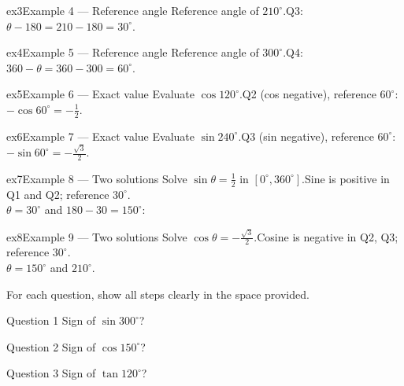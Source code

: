 \documentclass[11pt]{article}
\begin{document}
\begin{example}{ex3}{Example 4 --- Reference angle}
Reference angle of $210^\circ$.\soln Q3: $\theta-180=210-180=30^\circ$.
\end{example}

\begin{example}{ex4}{Example 5 --- Reference angle}
Reference angle of $300^\circ$.\soln Q4: $360-\theta=360-300=60^\circ$.
\end{example}

\begin{example}{ex5}{Example 6 --- Exact value}
Evaluate $\cos120^\circ$.\soln Q2 (cos negative), reference $60^\circ$: $-\cos60^\circ=-\tfrac12$.
\end{example}

\begin{example}{ex6}{Example 7 --- Exact value}
Evaluate $\sin240^\circ$.\soln Q3 (sin negative), reference $60^\circ$: $-\sin60^\circ=-\tfrac{\sqrt3}{2}$.
\end{example}

\begin{example}{ex7}{Example 8 --- Two solutions}
Solve $\sin\theta=\tfrac12$ in $[0^\circ,360^\circ]$.\soln Sine is positive in Q1 and Q2; reference $30^\circ$. \\ $\theta=30^\circ$ and $180-30=150^\circ$:
\end{example}

\begin{example}{ex8}{Example 9 --- Two solutions}
Solve $\cos\theta=-\tfrac{\sqrt3}{2}$.\soln Cosine is negative in Q2, Q3; reference $30^\circ$. \\ $\theta=150^\circ$ and $210^\circ$.
\end{example}

\clearpage
{}
For each question, show all steps clearly in the space provided.

\begin{qbox}{Question 1}
Sign of $\sin300^\circ$?\workspace{2.4cm}
\end{qbox}

\begin{qbox}{Question 2}
Sign of $\cos150^\circ$?\workspace{2.4cm}
\end{qbox}

\begin{qbox}{Question 3}
Sign of $\tan120^\circ$?\workspace{2.4cm}
\end{qbox}
\end{document}
